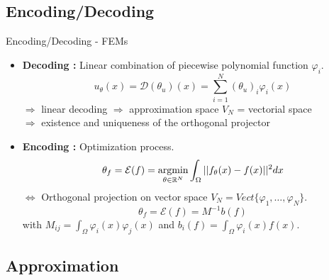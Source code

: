 \subsection{Encoding/Decoding}

\begin{frame}{Encoding/Decoding - FEMs}
	\begin{itemize}[\textbullet]
		\item \textbf{Decoding :} Linear combination of piecewise polynomial function $\varphi_i$.
		\begin{equation*}
			u_\theta(x)=\mathcal{D}(\theta_u)(x) = \sum_{i=1}^{N}(\theta_u)_i\varphi_i(x)
		\end{equation*}
		$\Rightarrow$ linear decoding $\Rightarrow$ approximation space $V_N$ = vectorial space \\
		$\Rightarrow$ existence and uniqueness of the orthogonal projector
		\item \textbf{Encoding :} Optimization process.
		\begin{equation*}
			\displaystyle \theta_f=\mathcal{E}(f)=\operatorname*{argmin}_{\theta\in\mathbb{R}^N}\int_\Omega ||f_\theta(x)-f(x)||^2 dx
		\end{equation*}
		$\Leftrightarrow$ Orthogonal projection on vector space $V_N=Vect\{\varphi_1,\dots,\varphi_N\}$.
		\begin{equation*}
			\theta_f=\mathcal{E}(f)=M^{-1}b(f)
		\end{equation*}
		with $M_{ij}=\int_\Omega \varphi_i(x)\varphi_j(x)$ and $b_i(f)=\int_\Omega \varphi_i(x)f(x)$.  
	\end{itemize}
\end{frame}

\subsection{Approximation}

